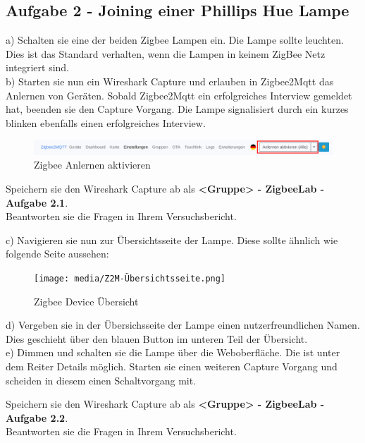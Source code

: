 \subsection{Aufgabe 2 - Joining einer Phillips Hue Lampe}
a) Schalten sie eine der beiden Zigbee Lampen ein. Die Lampe sollte leuchten. Dies ist das Standard verhalten, wenn die Lampen in keinem ZigBee Netz integriert sind.\\
b) Starten sie nun ein Wireshark Capture und erlauben in Zigbee2Mqtt das Anlernen von Geräten. Sobald Zigbee2Mqtt ein erfolgreiches Interview gemeldet hat, beenden sie
den Capture Vorgang. Die Lampe signalisiert durch ein kurzes blinken ebenfalls einen erfolgreiches Interview.

\begin{figure}[H]
    \centering
    \includegraphics[width=1\textwidth]{media/Z2M-Anlernen.png}
    \caption{Zigbee Anlernen aktivieren}
\end{figure}

\begin{Aufgabe}
    Speichern sie den Wireshark Capture ab als \textbf{\grqq <Gruppe> - ZigbeeLab - Aufgabe 2.1\grqq{}}. \\
    Beantworten sie die Fragen in Ihrem Versuchsbericht.
\end{Aufgabe}

c) Navigieren sie nun zur Übersichtsseite der Lampe. Diese sollte ähnlich wie folgende Seite aussehen:

\begin{figure}[H]
    \centering
    \texttt{[image: media/Z2M-Übersichtsseite.png]}
    \caption{Zigbee Device Übersicht}
\end{figure}

d) Vergeben sie in der Übersichsseite der Lampe einen nutzerfreundlichen Namen. Dies geschieht über den blauen Button im unteren Teil der Übersicht.\\
e) Dimmen und schalten sie die Lampe über die Weboberfläche. Die ist unter dem Reiter \grqq Details\grqq{} möglich. Starten sie einen weiteren Capture Vorgang und
scheiden in diesem einen Schaltvorgang mit.

\begin{Aufgabe}
    Speichern sie den Wireshark Capture ab als \textbf{\grqq <Gruppe> - ZigbeeLab - Aufgabe 2.2\grqq{}}. \\
    Beantworten sie die Fragen in Ihrem Versuchsbericht.
\end{Aufgabe}

